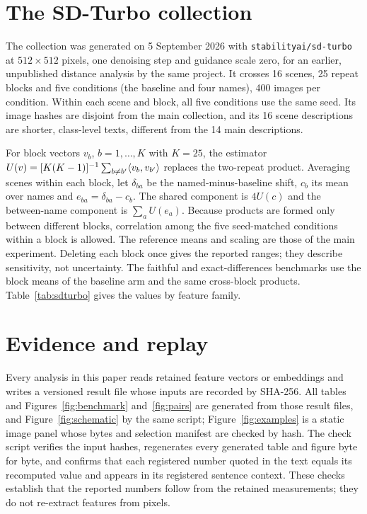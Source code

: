 \FloatBarrier
\section{The SD-Turbo collection}\label{app:sdturbo}

The collection was generated on 5 September 2026 with \texttt{stabilityai/sd-turbo} at
$512\times512$ pixels, one denoising step and guidance scale zero, for an earlier, unpublished
distance analysis by the same project. It crosses 16 scenes, 25 repeat blocks and five
conditions (the baseline and four names), 400 images per condition. Within each scene and
block, all five conditions use the same seed. Its image hashes are disjoint from the main
collection, and its 16 scene descriptions are shorter, class-level texts, different from the 14
main descriptions.

For block vectors $v_b$, $b=1,\dots,K$ with $K=25$, the estimator
$U(v)=[K(K-1)]^{-1}\sum_{b\ne b'}\langle v_b,v_{b'}\rangle$ replaces the two-repeat product. Averaging
scenes within each block, let $\delta_{ba}$ be the named-minus-baseline shift, $c_b$ its mean
over names and $e_{ba}=\delta_{ba}-c_b$. The shared component is $4U(c)$ and the between-name
component is $\sum_aU(e_a)$. Because products are formed only between different blocks,
correlation among the five seed-matched conditions within a block is allowed. The reference
means and scaling are those of the main experiment. Deleting each block once gives the reported
ranges; they describe sensitivity, not uncertainty. The faithful and exact-differences benchmarks use
the block means of the baseline arm and the same cross-block products. Table~\ref{tab:sdturbo}
gives the values by feature family.



\FloatBarrier
\section{Evidence and replay}\label{app:replay}

Every analysis in this paper reads retained feature vectors or embeddings and writes a versioned
result file whose inputs are recorded by SHA-256. All tables and Figures~\ref{fig:benchmark}
and~\ref{fig:pairs} are generated from those result files, and Figure~\ref{fig:schematic} by the
same script; Figure~\ref{fig:examples} is a static image panel whose bytes and selection manifest are
checked by hash. The check script verifies the input hashes, regenerates every generated table and
figure byte for byte, and confirms that each registered number quoted in the text equals its
recomputed value and appears in its registered sentence context. These checks establish that the
reported numbers follow from the retained measurements; they do not re-extract features from
pixels.
